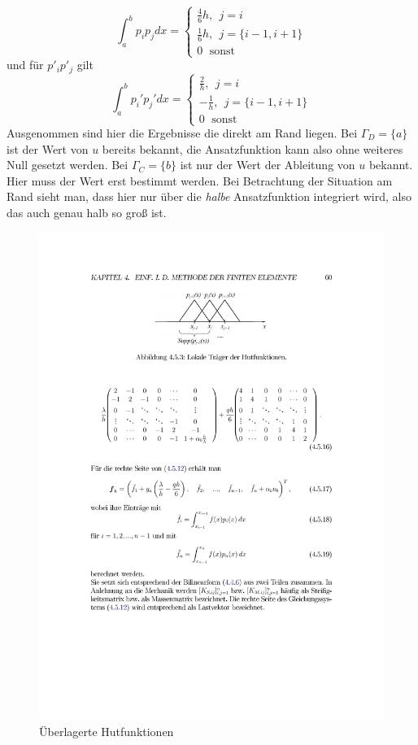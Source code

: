 	\begin{equation}
	\int_{a}^{b} p_ip_j dx = \begin{cases}
	\frac{4}{6}h, ~~ j=i \\
	\frac{1}{6}h,~~ j=\{i-1,i+1\}\\
	0\, ~~\text{sonst}
	\end{cases}
	\end{equation}
	und für $p'_i p'_j$ gilt
	\begin{equation}
	\int_{a}^{b} p_i' p_j' dx = \begin{cases}
	\frac{2}{h}, ~~ j=i \\
	-\frac{1}{h},~~ j=\{i-1,i+1\}\\
	0\, ~~\text{sonst}
	\end{cases}
	\end{equation}
	Ausgenommen sind hier die Ergebnisse die direkt am Rand liegen. Bei $\Gamma_D = \{a\}$ ist der Wert von $u$ bereits bekannt, die Ansatzfunktion kann also ohne weiteres Null gesetzt werden. Bei $\Gamma_C = \{b\}$ ist nur der Wert der Ableitung von $u$ bekannt. Hier muss der Wert erst bestimmt werden. Bei Betrachtung der Situation am Rand sieht man, dass hier nur über die \textit{halbe} Ansatzfunktion integriert wird, also das auch genau halb so groß ist.
	\begin{figure}
		\centering
		\includegraphics[width=0.7\linewidth]{img/hutfunktionen}
		\caption{Überlagerte Hutfunktionen}
		\label{fig:hutfunktionen}
	\end{figure}
	
